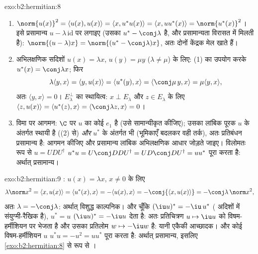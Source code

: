 \begin{solution}{exo:b2:hermitian:8}
\begin{enumerate}
  \item $\norm{u(x)}^2 = \langle u(x), u(x)\rangle = \langle x,
        u^*u(x)\rangle = \langle x, uu^*(x)\rangle =
        \norm{u^*(x)}^2$। इसे प्रसामान्य $u -
        \lambda\,\mathrm{id}$ पर लगाइए (उसका  $u^* -
        \conj\lambda$ है, और
        प्रसामान्यता विरासत में मिलती है): $\norm{(u -
        \lambda)x} = \norm{(u^* - \conj\lambda)x}$, अतः दोनों केंद्रक मेल
        खाते हैं।
  \item अभिलक्षणिक सदिशों $u(x) = \lambda x$, $u(y) = \mu y$ ($\lambda \neq \mu$) के लिए: (1) का उपयोग करके $u^*(x) = \conj\lambda x$;
        फिर
        \[
        \lambda\langle y, x\rangle = \langle y, u(x)\rangle
        = \langle u^*(y), x\rangle = \langle \conj\mu\, y, x\rangle
        = \mu \langle y, x\rangle ,
        \]
        अतः $\langle y, x\rangle = 0$। $E_\lambda^\perp$ का स्थायित्व: $x \perp E_\lambda$ और $z \in E_\lambda$ के लिए $\langle z,
        u(x)\rangle = \langle u^*(z), x\rangle =
        \langle\conj\lambda z, x\rangle = 0$।
  \item विमा पर आगमन: $\C$ पर $u$ का कोई  $e_1$ है (उसे
        सामान्यीकृत कीजिए); उसका लांबिक पूरक $u$ के अंतर्गत स्थायी है
        ((2) से) \emph{और} $u^*$ के अंतर्गत भी (भूमिकाएँ बदलकर वही तर्क),
        अतः प्रतिबंधन प्रसामान्य है: आगमन कीजिए और प्रसामान्य लांबिक
        अभिलक्षणिक आधार जोड़ते जाइए। विलोमतः  रूप से  $u = UDU^\dagger$
        $u^*u
        = U\conj D D U^\dagger = U D\conj D U^\dagger = uu^*$ पूरा करता है: अर्थात् प्रसामान्य।
\end{enumerate}
\end{solution}

\begin{solution}{exo:b2:hermitian:9}
: $u(x) = \lambda x$, $x \neq 0$ के लिए
\[
\lambda\norm x^2 = \langle x, u(x)\rangle
= \langle u^*(x), x\rangle = -\langle u(x), x\rangle
= -\conj{\langle x, u(x)\rangle} = -\conj\lambda\,\norm x^2 ,
\]
अतः $\lambda = -\conj\lambda$: अर्थात् विशुद्ध काल्पनिक। और चूँकि $(\iu
u)^* = -\iu\,u^*$ ( अदिशों में
संयुग्मी-रैखिक है), $u^* = u$ $(\iu u)^* = -\iu u$ देता है: अतः प्रतिचित्रण $u \mapsto \iu u$  को
विषम-हर्मीशियन पर भेजता है और उसका प्रतिलोम $w \mapsto -\iu
w$ है: यानी एकैकी आच्छादक।
और कोई विषम-हर्मीशियन $u$ $u^*u = -u^2 =
uu^*$ पूरा करता है: अर्थात् प्रसामान्य, इसलिए
\cref{exo:b2:hermitian:8} से  रूप से ।
\end{solution}

